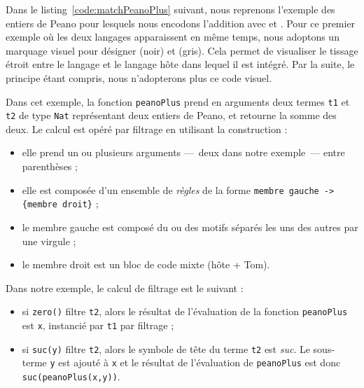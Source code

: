 Dans le listing~\ref{code:matchPeanoPlus} suivant, nous reprenons l'exemple des
entiers de Peano pour lesquels nous encodons l'addition avec {\tom} et {\java}.
Pour ce premier exemple où les deux langages apparaissent en même temps, nous
adoptons un marquage visuel pour désigner {\java} (noir) et {\tom} (gris). Cela
permet de visualiser le tissage étroit entre le langage {\tom} et le langage
hôte dans lequel il est intégré. Par la suite, le principe étant compris, nous
n'adopterons plus ce code visuel.

 
Dans cet exemple, la fonction \texttt{peanoPlus} prend en arguments deux termes
\texttt{t1} et \texttt{t2} de type \texttt{Nat}
représentant deux entiers de Peano, et retourne la
somme des deux. 
Le calcul est opéré par filtrage en utilisant la construction  :
\begin{itemize}
  \item elle prend un ou plusieurs arguments ---~deux dans notre exemple~---
    entre parenthèses ;
  \item elle est composée d'un ensemble de \emph{règles} de la forme
    \texttt{membre gauche -> \{membre droit\}} ;
  \item le membre gauche est composé du ou des motifs séparés les uns des autres
    par une virgule ;
  \item le membre droit est un bloc de code mixte (hôte + \textsf{Tom}).
\end{itemize}
Dans notre exemple, le calcul de filtrage est le suivant : 
\begin{itemize}
  \item si \texttt{zero()} filtre \texttt{t2}, alors le résultat de
    l'évaluation de la fonction \texttt{peanoPlus} est \texttt{x}, instancié par
    \texttt{t1} par filtrage ;
  \item si \texttt{suc(y)} filtre \texttt{t2}, alors le symbole de tête du
    terme \texttt{t2} est \emph{suc}. Le sous-terme \texttt{y} est ajouté à
    \texttt{x} et le résultat de l'évaluation de \texttt{peanoPlus} est donc
    \texttt{suc(peanoPlus(x,y))}.
\end{itemize}
